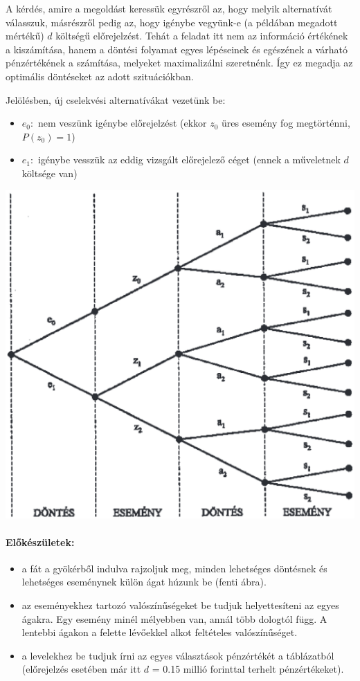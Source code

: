 \documentclass[a4paper,12pt]{article}
\begin{document}
A kérdés, amire a megoldást keressük egyrészről az, hogy melyik alternatívát válasszuk, másrészről pedig az, hogy igénybe vegyünk-e (a példában megadott mértékű) $d$ költségű előrejelzést. Tehát a feladat itt nem az információ értékének a kiszámítása, hanem a döntési folyamat egyes lépéseinek és egészének a várható pénzértékének a számítása, melyeket maximalizálni szeretnénk. Így ez megadja az optimális döntéseket az adott szituációkban.

Jelölésben, új cselekvési alternatívákat vezetünk be: 
\begin{itemize}
\item $e_{0}:$ nem veszünk igénybe előrejelzést (ekkor $z_{0}$ üres esemény fog megtörténni, $P(z_0) = 1$)
\item $e_{1}:$ igénybe vesszük az eddig vizsgált előrejelező céget (ennek a műveletnek $d$ költsége van)
\end{itemize}

\begin{center}

\includegraphics[scale=0.7]{dectree01}
\\
\end{center}

\paragraph{Előkészületek: }
\begin{itemize}
\item a fát a gyökérből indulva rajzoljuk meg, minden lehetséges döntésnek és lehetséges eseménynek külön ágat húzunk be (fenti ábra).
\item az eseményekhez tartozó valószínűségeket be tudjuk helyettesíteni az egyes ágakra. Egy esemény minél mélyebben van, annál több dologtól függ. A lentebbi ágakon a felette lévőekkel alkot feltételes valószínűséget.
\item a levelekhez be tudjuk írni az egyes választások pénzértékét a táblázatból (előrejelzés esetében már itt $d$ = 0.15 millió forinttal terhelt pénzértékeket).
\end{itemize}
\end{document}
